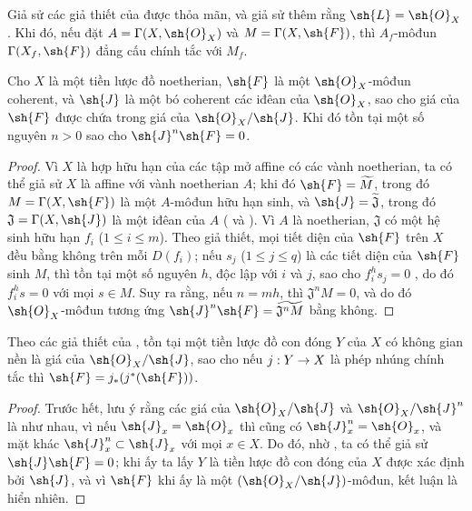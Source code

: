 \documentclass[oneside]{amsart}
\makeatletter
\renewcommand{\leq}{\leqslant}
\newcommand{\ega@arrow}[2]{\mathchoice{#1}{#2}{#2}{#2}}
\renewcommand{\to}{\ega@arrow{\longrightarrow}{\rightarrow}}
\let\EGAOriginalLabel\label
\renewcommand{\label}[1]{\phantomsection\EGAOriginalLabel{#1}}
\makeatother
\begin{document}
\begin{corollary}[9.3.3]
\label{I.9.3.3}
Giả sử các giả thiết của  được thỏa mãn, và giả sử thêm rằng
$\sh{L}=\sh{O}_X$. Khi đó, nếu đặt $A=\Gamma(X,\sh{O}_X)$ và $M=\Gamma(X,\sh{F})$, thì $A_f$-môđun
$\Gamma(X_f,\sh{F})$ đẳng cấu chính tắc với $M_f$.
\end{corollary}

\begin{proposition}[9.3.4]
\label{I.9.3.4}
Cho $X$ là một tiền lược đồ noetherian, $\sh{F}$ là một $\sh{O}_X$-môđun coherent, và
$\sh{J}$ là một bó coherent các iđêan của $\sh{O}_X$, sao cho giá của $\sh{F}$ được chứa
trong giá của $\sh{O}_X/\sh{J}$. Khi đó tồn tại một số nguyên $n>0$ sao cho $\sh{J}^n\sh{F}=0$.
\end{proposition}

\begin{proof}
Vì $X$ là hợp hữu hạn của các tập mở affine có các vành noetherian, ta có thể giả sử
$X$ là affine với vành noetherian $A$; khi đó $\sh{F}=\widetilde{M}$, trong đó
$M=\Gamma(X,\sh{F})$ là một $A$-môđun hữu hạn sinh, và $\sh{J}=\widetilde{\mathfrak{J}}$,
trong đó $\mathfrak{J}=\Gamma(X,\sh{J})$ là một iđêan của $A$ ( và
). Vì $A$ là noetherian, $\mathfrak{J}$ có một hệ sinh hữu hạn
$f_i$ ($1\leq i\leq m$). Theo giả thiết, mọi tiết diện của $\sh{F}$ trên
$X$ đều bằng không trên mỗi $D(f_i)$; nếu $s_j$ ($1\leq j\leq q$) là các tiết diện của
$\sh{F}$ sinh $M$, thì tồn tại một số nguyên $h$, độc lập với $i$ và $j$,
sao cho $f_i^h s_j=0$ , do đó $f_i^h s=0$ với mọi $s\in M$. Suy ra rằng,
nếu $n=mh$, thì $\mathfrak{J}^n M=0$, và do đó $\sh{O}_X$-môđun tương ứng
$\sh{J}^n\sh{F}=\widetilde{\mathfrak{J}^n M}$  bằng không.
\end{proof}

\begin{corollary}[9.3.5]
\label{I.9.3.5}
Theo các giả thiết của , tồn tại một tiền lược đồ con đóng $Y$ của $X$
có không gian nền là giá của $\sh{O}_X/\sh{J}$, sao cho nếu $j:Y\to X$ là phép nhúng
chính tắc thì $\sh{F}=j_*(j^*(\sh{F}))$.
\end{corollary}

\begin{proof}
Trước hết, lưu ý rằng các giá của $\sh{O}_X/\sh{J}$ và $\sh{O}_X/\sh{J}^n$ là như nhau,
vì nếu $\sh{J}_x=\sh{O}_x$ thì cũng có $\sh{J}_x^n=\sh{O}_x$, và mặt khác
$\sh{J}_x^n\subset\sh{J}_x$ với mọi $x\in X$. Do đó, nhờ , ta có thể giả
sử $\sh{J}\sh{F}=0$; khi ấy ta lấy $Y$ là tiền lược đồ con đóng của $X$ được xác định
bởi $\sh{J}$, và vì $\sh{F}$ khi ấy là một $(\sh{O}_X/\sh{J})$-môđun, kết luận là hiển nhiên.
\end{proof}
\end{document}
